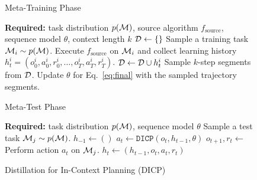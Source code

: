 \documentclass{article}
\begin{document}
\begin{figure}[t]
    \vspace{-13pt}
    \begin{minipage}[t!]{0.49\textwidth}
        \begin{algorithm}[H]
            \caption{Meta-Training Phase}
            \label{alg:train}
            \begin{algorithmic}[1]
                \STATE \textbf{Required:} task distribution $p({\mathcal{M}})$, source algorithm $f_\textrm{source}$, sequence model $\theta$, context length $k$
                \STATE ${\mathcal{D}} \gets \{\}$
                    \STATE Sample a training task ${\mathcal{M}}_i \sim p({\mathcal{M}})$.
                    \STATE Execute $f_\textrm{source}$ on ${\mathcal{M}}_i$ and collect learning history $h_t^i=(o_0^i, a_0^i, r_0^i, \dots, o_T^i, a_T^i, r_T^i)$.
                    \STATE ${\mathcal{D}} \gets {\mathcal{D}} \cup h_t^i$
                \ENDFOR
                    \STATE Sample $k$-step segments from ${\mathcal{D}}$.
                    \STATE Update $\theta$ for Eq.~\ref{eq:final} with the sampled trajectory segments.
                \ENDWHILE
            \end{algorithmic}
        \end{algorithm}
        \vspace{-5.45mm}
        \begin{algorithm}[H]
            \caption{Meta-Test Phase}
            \label{alg:test}
            \begin{algorithmic}[1]
                \STATE \textbf{Required:} task distribution $p({\mathcal{M}})$, sequence model $\theta$
                    \STATE Sample a test task ${\mathcal{M}}_j \sim p({\mathcal{M}})$.
                    \STATE $h_{-1} \gets ()$
                        \STATE $a_t \gets \texttt{DICP}(o_t, h_{t-1}, \theta)$\label{alg:test:act}
                        \STATE $o_{t+1}, r_t \gets$ Perform action $a_t$ on ${\mathcal{M}}_j$.
                        \STATE $h_t \gets (h_{t-1},o_t,a_t,r_t) $
                    \ENDFOR
                \ENDFOR
            \end{algorithmic}
        \end{algorithm}
    \end{minipage}
    \hfill
    \begin{minipage}[t!]{0.49\textwidth}
        \begin{algorithm}[H]
            \caption{Distillation for In-Context Planning (DICP)}
            \label{alg:icp}

\end{algorithm}
\end{minipage}
\end{figure}
\end{document}
